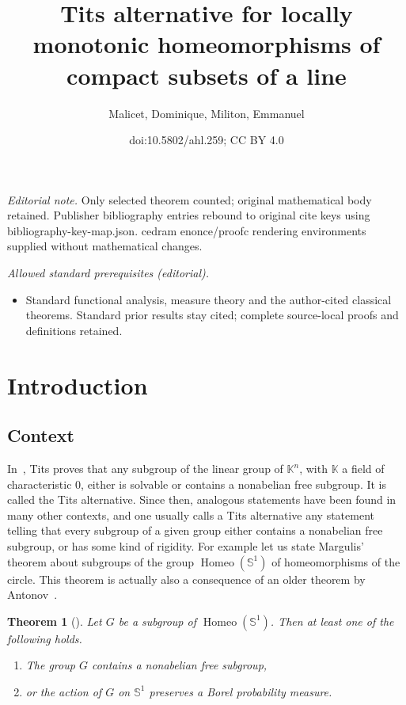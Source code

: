 \documentclass[10pt]{amsart}
\title{Tits alternative for locally monotonic homeomorphisms of compact subsets of a line}
\author{Malicet, Dominique, Militon, Emmanuel}
\date{doi:10.5802/ahl.259; CC BY 4.0}
\newtheorem{theo}{Theorem}[section]
\theoremstyle{definition}\newtheorem{defi}[theo]{Definition}\newtheorem{rema}[theo]{Remark}\newtheorem{exam}[theo]{Example}\newtheorem{exem}[theo]{Example}\newtheorem{nota}[theo]{Notation}
\DeclareMathOperator{\Homeo}{Homeo}
\newcommand{\bbK}{\mathbb{K}}
\newcommand{\bbS}{\mathbb{S}}
\begin{document}
\maketitle
\noindent\textit{Editorial note.} Only selected theorem counted; original mathematical body retained. Publisher bibliography entries rebound to original cite keys using bibliography-key-map.json. cedram enonce/proofc rendering environments supplied without mathematical changes.\par\medskip
\noindent\textit{Allowed standard prerequisites (editorial).}\begin{itemize}
\item Standard functional analysis, measure theory and the author-cited classical theorems. Standard prior results stay cited; complete source-local proofs and definitions retained.
\end{itemize}\medskip






\section{Introduction}

\subsection{Context}

In~\cite{Tits}, Tits proves that any subgroup of the linear group of $\bbK^n$, with $\bbK$ a field of characteristic $0$, either is solvable or contains a nonabelian free subgroup. It is called the Tits alternative. Since then, analogous statements have been found in many other contexts, and one usually calls a Tits alternative any statement telling that every subgroup of a given group either contains a nonabelian free subgroup, or has some kind of rigidity. For example let us state Margulis' theorem about subgroups of the group $\Homeo(\bbS^1)$ of homeomorphisms of the circle. This theorem is actually also a consequence of an older theorem by Antonov~\cite{Ant}.

\begin{theo}[{\cite{Mar}}]
\label{Margulis}
Let $G$ be a subgroup of $\Homeo(\bbS^1)$. Then at least one of the following holds.
\begin{enumerate}
\item\label{theo1.1.1} The group $G$ contains a nonabelian free subgroup,
\item\label{theo1.1.2} or the action of $G$ on $\bbS^1$ preserves a Borel probability measure.
\end{enumerate}
\end{theo}
\end{document}
